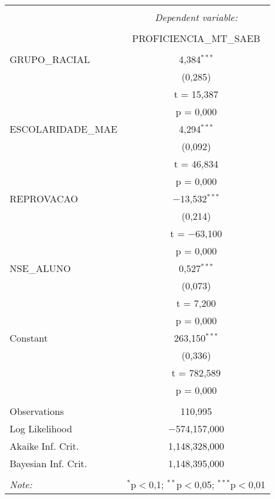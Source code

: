 
\begin{table}[!htbp] \centering 
  \caption{} 
  \label{} 
\begin{tabular}{@{\extracolsep{5pt}}lc} 
\\[-1.8ex]\hline 
\hline \\[-1.8ex] 
 & \multicolumn{1}{c}{\textit{Dependent variable:}} \\ 
\cline{2-2} 
\\[-1.8ex] & PROFICIENCIA\_MT\_SAEB \\ 
\hline \\[-1.8ex] 
 GRUPO\_RACIAL & 4,384$^{***}$ \\ 
  & (0,285) \\ 
  & t = 15,387 \\ 
  & p = 0,000 \\ 
  ESCOLARIDADE\_MAE & 4,294$^{***}$ \\ 
  & (0,092) \\ 
  & t = 46,834 \\ 
  & p = 0,000 \\ 
  REPROVACAO & $-$13,532$^{***}$ \\ 
  & (0,214) \\ 
  & t = $-$63,100 \\ 
  & p = 0,000 \\ 
  NSE\_ALUNO & 0,527$^{***}$ \\ 
  & (0,073) \\ 
  & t = 7,200 \\ 
  & p = 0,000 \\ 
  Constant & 263,150$^{***}$ \\ 
  & (0,336) \\ 
  & t = 782,589 \\ 
  & p = 0,000 \\ 
 \hline \\[-1.8ex] 
Observations & 110,995 \\ 
Log Likelihood & $-$574,157,000 \\ 
Akaike Inf. Crit. & 1,148,328,000 \\ 
Bayesian Inf. Crit. & 1,148,395,000 \\ 
\hline 
\hline \\[-1.8ex] 
\textit{Note:}  & \multicolumn{1}{r}{$^{*}$p$<$0,1; $^{**}$p$<$0,05; $^{***}$p$<$0,01} \\ 
\end{tabular} 
\end{table} 
